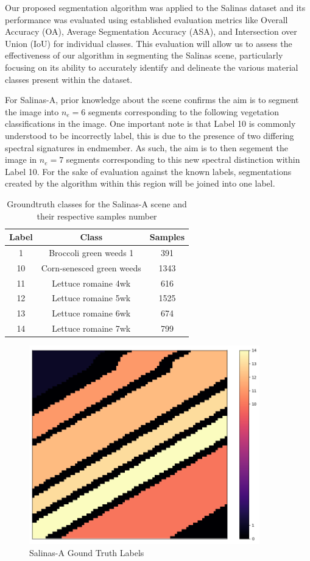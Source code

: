 Our proposed segmentation algorithm was applied to the Salinas dataset and its performance was evaluated using established evaluation metrics like Overall Accuracy (OA), Average Segmentation Accuracy (ASA), and Intersection over Union (IoU) for individual classes. This evaluation will allow us to assess the effectiveness of our algorithm in segmenting the Salinas scene, particularly focusing on its ability to accurately identify and delineate the various material classes present within the dataset.

For Salinas-A, prior knowledge about the scene confirms the aim is to segment the image into $n_e = 6$ segments corresponding to the following vegetation classifications in the image. One important note is that Label 10 is commonly understood to be incorrectly label, this is due to the presence of two differing spectral signatures in endmember. As such, the aim is to then segement the image in $n_e = 7$ segments corresponding to this new spectral distinction within Label 10. For the sake of evaluation against the known labels, segmentations created by the algorithm within this region will be joined into one label.
\begin{table}[H]
    \centering
    \label{tab:salinas_classes}
    \begin{tabular}{|c|c|c|}
    \hline
    \textbf{Label} & \textbf{Class} & \textbf{Samples} \\
    \hline
    1 & Broccoli green weeds 1 & 391 \\
    10 & Corn-senesced green weeds & 1343 \\
    11 &Lettuce romaine 4wk & 616 \\
    12 & Lettuce romaine 5wk & 1525 \\
    13 & Lettuce romaine 6wk & 674 \\
    14 &Lettuce romaine 7wk & 799 \\
    \hline
    \end{tabular}
    \caption{Groundtruth classes for the Salinas-A scene and their respective samples number}
\end{table}
\begin{figure}[h]
    \centering
    \includegraphics[width=10cm]{salinas-a-error.png}  %
    \caption{Salinas-A Gound Truth Labels}
    \label{salina-a}  %
  \end{figure}
